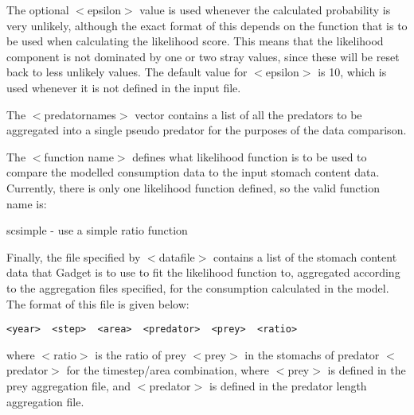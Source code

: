 \documentclass[10pt,twoside]{book}
\begin{document}


The optional $<$epsilon$>$ value is used whenever the calculated probability is very unlikely, although the exact format of this depends on the function that is to be used when calculating the likelihood score.  This means that the likelihood component is not dominated by one or two stray values, since these will be reset back to less unlikely values.  The default value for $<$epsilon$>$ is 10, which is used whenever it is not defined in the input file.

\bigskip
The $<$predatornames$>$ vector contains a list of all the predators to be aggregated into a single pseudo predator for the purposes of the data comparison.

\bigskip
The $<$function name$>$ defines what likelihood function is to be used to compare the modelled consumption data to the input stomach content data.  Currently, there is only one likelihood function defined, so the valid function name is:

\bigskip
scsimple - use a simple ratio function

\bigskip
Finally, the file specified by $<$datafile$>$ contains a list of the stomach content data that Gadget is to use to fit the likelihood function to, aggregated according to the aggregation files specified, for the consumption calculated in the model.  The format of this file is given below:

{\small\begin{verbatim}
<year>  <step>  <area>  <predator>  <prey>  <ratio>
\end{verbatim}}

where $<$ratio$>$ is the ratio of prey $<$prey$>$ in the stomachs of predator $<$predator$>$ for the timestep/area combination, where $<$prey$>$ is defined in the prey aggregation file, and $<$predator$>$ is defined in the predator length aggregation file.
\end{document}
